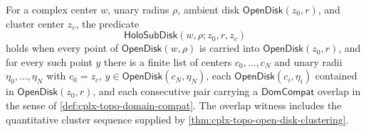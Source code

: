 \begin{definition}
\label{def:holo-certified-smaller-disk}
For a complex center $w$, unary radius $\rho$, ambient disk $\mathsf{OpenDisk}(z_0,r)$, and cluster center $z_c$, the predicate
$$
\mathsf{HoloSubDisk}(w,\rho;z_0,r,z_c)
$$
holds when every point of $\mathsf{OpenDisk}(w,\rho)$ is carried into $\mathsf{OpenDisk}(z_0,r)$, and for every such point $y$ there is a finite list of centers $c_0,\ldots,c_N$ and unary radii $\eta_0,\ldots,\eta_N$ with $c_0=z_c$, $y\in\mathsf{OpenDisk}(c_N,\eta_N)$, each $\mathsf{OpenDisk}(c_i,\eta_i)$ contained in $\mathsf{OpenDisk}(z_0,r)$, and each consecutive pair carrying a $\mathsf{DomCompat}$ overlap in the sense of \autoref{def:cplx-topo-domain-compat}. The overlap witness includes the quantitative cluster sequence supplied by \autoref{thm:cplx-topo-open-disk-clustering}.
\end{definition}

